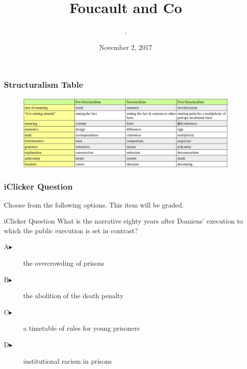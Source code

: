 \documentclass[xcolor=dvipsnames]{beamer}
\title{Foucault and Co}
\subtitle{{\CourseNumber}, {\CourseInst}}
\author{\CourseName}
\date{November 2, 2017}
\begin{document}
\begin{frame}
  \titlepage
\end{frame}

\begin{frame}
  \frametitle{Structuralism Table}
\begin{figure}[h]
\includegraphics[scale=.3]{./structable.png}
\end{figure}
\end{frame}

\begin{frame}
  \frametitle{iClicker Question}
Choose from the following options. This item will be graded.
\begin{block}{iClicker Question}
What is the narrative eighty years after Damiens' execution to which
the public execution is set in contrast?
\end{block}
\begin{description}
\item[A\hspace{.2in}$\blacktriangleright$] the overcrowding of prisons
\item[B\hspace{.2in}$\blacktriangleright$] the abolition of the death penalty
\item[C\hspace{.2in}$\blacktriangleright$] a timetable of rules for young prisoners
\item[D\hspace{.2in}$\blacktriangleright$] institutional racism in prisons
\end{description}
\end{frame}
\end{document}
